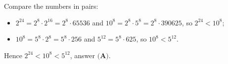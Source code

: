 Compare the numbers in pairs:
\begin{itemize}
\item $2^{24}=2^8\cdot2^{16}=2^8\cdot65536$ and $10^8=2^8\cdot5^8=2^8\cdot390625$, so $2^{24}<10^8$;
\item $10^8=5^8\cdot2^8=5^8\cdot256$ and $5^{12}=5^8\cdot625$, so $10^8<5^{12}$.
\end{itemize}
Hence $2^{24}<10^8<5^{12}$, answer $\boxed{\textbf{(A)}}$.
